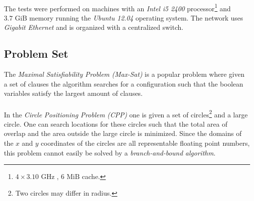 \documentclass[a4paper,10pt]{article}
\newcommand{\ssclab}[1]{\label{ssc:#1}}
\theoremstyle{definition}
\begin{document}
\paragraph{}
The tests were performed on machines with an \emph{Intel i5 2400} processor\footnote{$4\times 3.10\mbox{ GHz}$ , $6\mbox{ MiB}$ cache.} and $3.7\mbox{ GiB}$ memory running the \emph{Ubuntu 12.04} operating system. The network uses \emph{Gigabit Ethernet} and is organized with a centralized switch.

\subsection{Problem Set}
\ssclab{problemset}
The \emph{Maximal Satisfiability Problem (Max-Sat)} is a popular problem where given a set of clauses the algorithm searches for a configuration such that the boolean variables satisfy the largest amount of clauses.

\paragraph{}
In the \emph{Circle Positioning Problem (CPP)} one is given a set of circles\footnote{Two circles may differ in radius.} and a large circle. One can search locations for these circles such that the total area of overlap and the area outside the large circle is minimized. Since the domains of the $x$ and $y$ coordinates of the circles are all representable floating point numbers, this problem cannot easily be solved by a \emph{branch-and-bound algorithm}.
\end{document}
